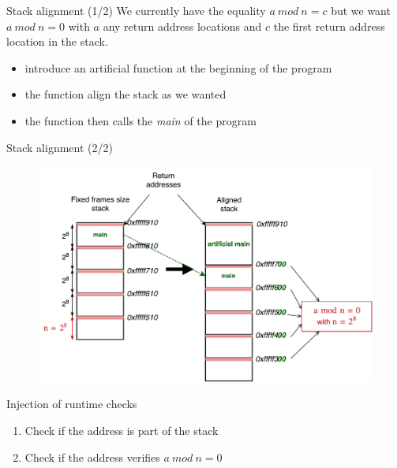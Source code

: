 \documentclass{beamer}
\begin{document}
\begin{frame}[c]{Stack alignment (1/2)}
	We currently have the equality $a~mod~n=c$ but we want $a~mod~n=0$ with $a$ any return address locations  and $c$ the first return address location in the stack.
	\begin{itemize}
		\item introduce an artificial function at the beginning of the program
		\item the function align the stack as we wanted
		\item the function then calls the \textit{main} of the program
	\end{itemize}
\end{frame}

\begin{frame}[c]{Stack alignment (2/2)}
	\begin{figure}
	\centering
	\includegraphics[width=\textwidth]{images/stack_align.pdf}
	\end{figure}
\end{frame}


\begin{frame}[fragile]{Injection of runtime checks}
	\begin{enumerate}
		\item Check if the address is part of the stack
		\item Check if the address verifies $a~mod~n=0$
	\end{enumerate}
	\hfill \break
	\Check
\end{frame}
\end{document}

